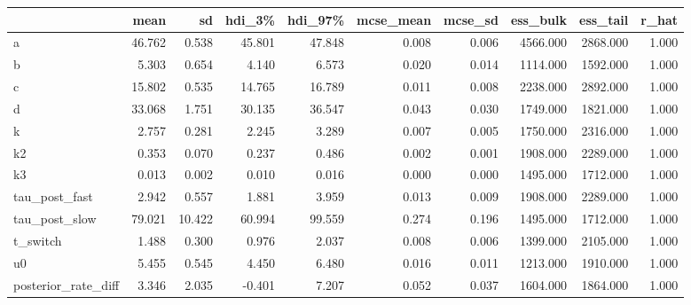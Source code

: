 \begin{tabular}{lrrrrrrrrr}
\toprule
 & mean & sd & hdi\_3\% & hdi\_97\% & mcse\_mean & mcse\_sd & ess\_bulk & ess\_tail & r\_hat \\
\midrule
a & 46.762 & 0.538 & 45.801 & 47.848 & 0.008 & 0.006 & 4566.000 & 2868.000 & 1.000 \\
b & 5.303 & 0.654 & 4.140 & 6.573 & 0.020 & 0.014 & 1114.000 & 1592.000 & 1.000 \\
c & 15.802 & 0.535 & 14.765 & 16.789 & 0.011 & 0.008 & 2238.000 & 2892.000 & 1.000 \\
d & 33.068 & 1.751 & 30.135 & 36.547 & 0.043 & 0.030 & 1749.000 & 1821.000 & 1.000 \\
k & 2.757 & 0.281 & 2.245 & 3.289 & 0.007 & 0.005 & 1750.000 & 2316.000 & 1.000 \\
k2 & 0.353 & 0.070 & 0.237 & 0.486 & 0.002 & 0.001 & 1908.000 & 2289.000 & 1.000 \\
k3 & 0.013 & 0.002 & 0.010 & 0.016 & 0.000 & 0.000 & 1495.000 & 1712.000 & 1.000 \\
tau\_post\_fast & 2.942 & 0.557 & 1.881 & 3.959 & 0.013 & 0.009 & 1908.000 & 2289.000 & 1.000 \\
tau\_post\_slow & 79.021 & 10.422 & 60.994 & 99.559 & 0.274 & 0.196 & 1495.000 & 1712.000 & 1.000 \\
t\_switch & 1.488 & 0.300 & 0.976 & 2.037 & 0.008 & 0.006 & 1399.000 & 2105.000 & 1.000 \\
u0 & 5.455 & 0.545 & 4.450 & 6.480 & 0.016 & 0.011 & 1213.000 & 1910.000 & 1.000 \\
posterior\_rate\_diff & 3.346 & 2.035 & -0.401 & 7.207 & 0.052 & 0.037 & 1604.000 & 1864.000 & 1.000 \\
\bottomrule
\end{tabular}
